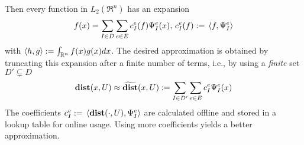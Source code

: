 Then every function in $L_2(\Re^n)$ has an expansion 
\[f(x) = \sum_{I \in D} \sum_{e \in E} c_I^e(f) \Psi^e_I(x), \, c_I^e(f) :=\, \langle f,\Psi^e_I \rangle\]
with $\langle h,g \rangle := \int_{\mathbb{R}^n}f(x)g(x)dx$.
The desired approximation is obtained by truncating this expansion after a finite number of terms, i.e., by using  a \textit{finite} set $D' \subsetneq D$
\begin{equation}
\mathbf{dist}(x,U) \approx \widetilde{\mathbf{dist}}(x,U) := \sum_{I \in D'} \sum_{e \in E} c_I^e \Psi^e_I(x)
\end{equation}
The coefficients $c_I^e :=\, \langle \mathbf{dist}(\cdot, U), \Psi^e_I \rangle$ are calculated offline and stored in a lookup table for online usage.
Using more coefficients yields a better approximation.




